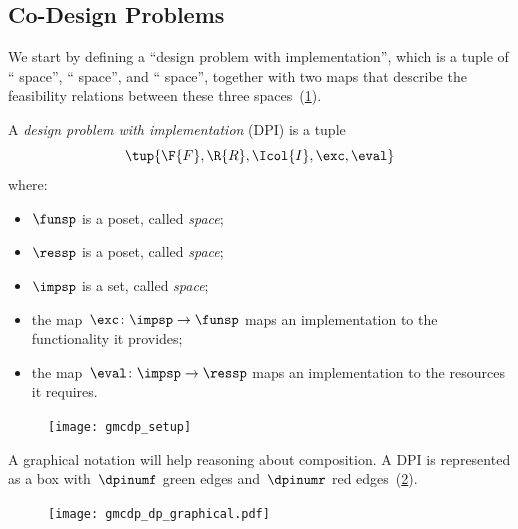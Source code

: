 \subsection{Co-Design Problems\label{sec:Design-Problems}}

  We start by defining
a ``design problem with implementation'', which is a tuple of ``
space'', `` space'', and ``
space'', together with two maps that describe the feasibility relations
between these three spaces~(\cref{fig:setup}).
\begin{definition}
\label{def:design_problem}A \emph{design problem with implementation}
(DPI) is a tuple
\begin{equation}
  \tup{\F{F},\R{R},\Icol{I},\exc,\eval}  
\end{equation}
where:

\begin{itemize}
\item $\funsp$ is a poset, called \emph{ space};
\item $\ressp$ is a poset, called \emph{ space};
\item $\impsp$ is a set, called \emph{ space};
\item the map~$\exc\colon\impsp\rightarrow\funsp$ 
maps an implementation to the functionality it provides;
\item the map~$\eval\colon\impsp\rightarrow\ressp$
maps an implementation to the resources it requires.
\end{itemize}

\begin{figure}[h]
\begin{center}
    \texttt{[image: gmcdp\_setup]}
\end{center}
\caption{\label{fig:setup}}
\end{figure}
\end{definition}


A graphical notation will help reasoning about composition. A DPI is represented as a box with~$\dpinumf$ green edges and~$\dpinumr$ red edges~(\cref{fig:dp_graphical}).

\begin{figure}[h]
    \centering
    \texttt{[image: gmcdp\_dp\_graphical.pdf]}
    \caption{\label{fig:dp_graphical}}
\end{figure}

